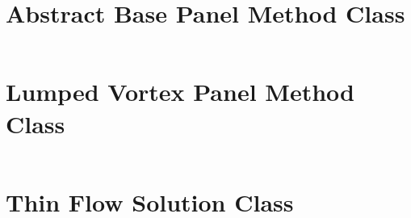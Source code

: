 \section{Abstract Base Panel Method Class}
\inputminted[firstline=321,lastline=512]{python}{../src/numfoil/solver/base.py}

\section{Lumped Vortex Panel Method Class}
\inputminted{python}{../src/numfoil/solver/m_lumped_vortex.py}

\section{Thin Flow Solution Class}
\inputminted[firstline=201,lastline=222]{python}{../src/numfoil/solver/base.py}
